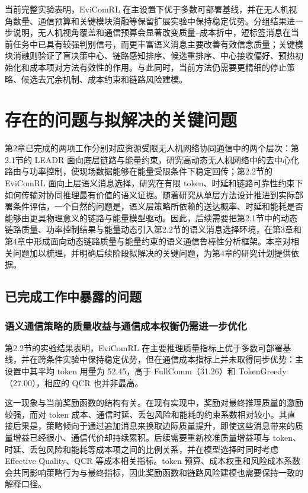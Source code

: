 当前完整实验表明，EviComRL 在主设置下优于多数可部署基线，并在无人机视角数量、通信预算和关键模块消融等保留扩展实验中保持稳定优势。分组结果进一步说明，无人机视角覆盖和通信预算会显著改变质量--成本折中，短标签消息在当前任务中已具有较强判别信号，而更丰富语义消息主要改善有效信念质量；关键模块消融则验证了盲决策中心、链路感知排序、候选重排序、中心接收偏好、预热初始化和成本项对方法有效性的作用。与此同时，当前方法仍需要更精细的停止策略、候选去冗余机制、成本约束和链路风险建模。

\section{存在的问题与拟解决的关键问题}
第2章已完成的两项工作分别对应资源受限无人机网络协同通信中的两个层次：第2.1节的 LEADR 面向底层链路与能量约束，研究高动态无人机网络中的去中心化路由与功率控制，使现场数据能够在能量受限条件下稳定回传；第2.2节的 EviComRL 面向上层语义消息选择，研究在有限 token、时延和链路可靠性约束下如何传输对协同推理最有价值的语义证据。随着研究从单层方法设计推进到实际部署条件评估，一个自然的问题是，语义层策略所依赖的送达概率、时延和能耗是否能够由更具物理意义的链路与能量模型驱动。因此，后续需要把第2.1节中的动态链路质量、功率控制结果与能量动态引入第2.2节的语义消息选择环境，在第3章和第4章中形成面向动态链路质量与能量约束的语义通信鲁棒性分析框架。本章对相关问题加以梳理，并明确后续阶段拟解决的关键问题，为第4章的研究计划提供依据。
\subsection{已完成工作中暴露的问题}
\subsubsection{语义通信策略的质量收益与通信成本权衡仍需进一步优化}
第2.2节的实验结果表明，EviComRL 在主要推理质量指标上优于多数可部署基线，并在跨条件实验中保持稳定优势，但在通信成本指标上并未取得同步优势：主设置中其平均 token 用量为 52.45，高于 FullComm（31.26）和 TokenGreedy（27.00），相应的 QCR 也并非最高。

这一现象与当前奖励函数的结构有关。在现有实现中，奖励对最终推理质量的激励较强，而对 token 成本、通信时延、丢包风险和能耗的约束系数相对较小。其直接后果是，策略倾向于通过追加消息来换取边际质量提升，即使这些消息带来的质量增益已经很小、通信代价却持续累积。后续需要重新校准质量增益项与 token、时延、丢包风险和能耗等成本项之间的比例关系，并在模型选择时同时考虑 Effective Quality、QCR 等成本相关指标。token 预算、成本权重和风险成本系数会共同影响策略行为与最终指标，因此奖励函数和链路风险建模也需要保持一致的解释口径。
